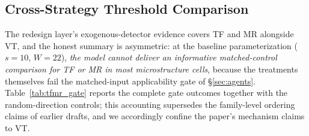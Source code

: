 \documentclass[12pt,a4paper]{article}
\begin{document}
\subsection{Cross-Strategy Threshold Comparison}
\label{sec:cross_strategy}

The redesign layer's exogenous-detector evidence covers TF and MR alongside VT, and the honest summary is asymmetric: at the baseline parameterization ($s=10$, $W=22$), \emph{the model cannot deliver an informative matched-control comparison for TF or MR in most microstructure cells}, because the treatments themselves fail the matched-input applicability gate of \S\ref{sec:agents}. Table~\ref{tab:tfmr_gate} reports the complete gate outcomes together with the random-direction controls; this accounting supersedes the family-level ordering claims of earlier drafts, and we accordingly confine the paper's mechanism claims to VT.
\end{document}
